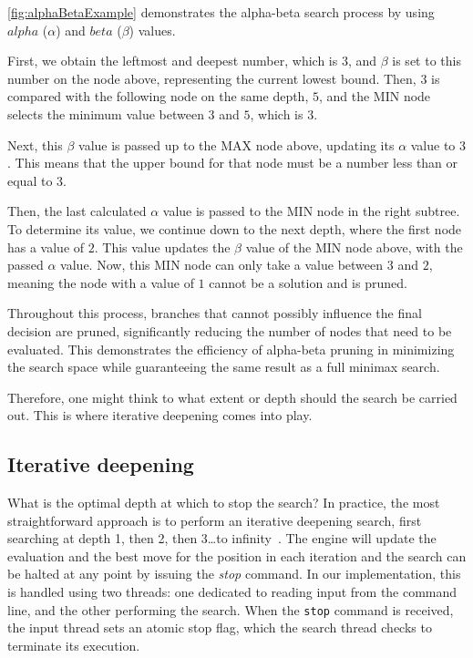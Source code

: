 \noindent\cref{fig:alphaBetaExample} demonstrates the alpha-beta search process by using $alpha$ ($\alpha$) and $beta$ ($\beta$) values.

\vspace{1em}

\noindent First, we obtain the leftmost and deepest number, which is $3$, and $\beta$ is set to this number on the node above, representing the current lowest bound. Then, $3$ is compared with the following node on the same depth, $5$, and the MIN node selects the minimum value between $3$ and $5$, which is $3$.

\vspace{1em}

\noindent Next, this $\beta$ value is passed up to the MAX node above, updating its $\alpha$ value to $3$. This means that the upper bound for that node must be a number less than or equal to $3$.

\vspace{1em}

\noindent Then, the last calculated $\alpha$ value is passed to the MIN node in the right subtree. To determine its value, we continue down to the next depth, where the first node has a value of $2$. This value updates the $\beta$ value of the MIN node above, with the passed $\alpha$ value. Now, this MIN node can only take a value between $3$ and $2$, meaning the node with a value of $1$ cannot be a solution and is pruned.

\vspace{1em}

\noindent Throughout this process, branches that cannot possibly influence the final decision are pruned, significantly reducing the number of nodes that need to be evaluated. This demonstrates the efficiency of alpha-beta pruning in minimizing the search space while guaranteeing the same result as a full minimax search.

\vspace{1em}

\noindent Therefore, one might think to what extent or depth should the search be carried out. This is where iterative deepening comes into play.

\subsection*{Iterative deepening}\label{sec:iterativeDeepening}

What is the optimal depth at which to stop the search? In practice, the most straightforward approach is to perform an iterative deepening search, first searching at depth 1, then 2, then 3\ldots to infinity~\cite{IterativeDeepening}. The engine will update the evaluation and the best move for the position in each iteration and the search can be halted at any point by issuing the \textit{stop} command. In our implementation, this is handled using two threads: one dedicated to reading input from the command line, and the other performing the search. When the \texttt{stop} command is received, the input thread sets an atomic stop flag, which the search thread checks to terminate its execution.

